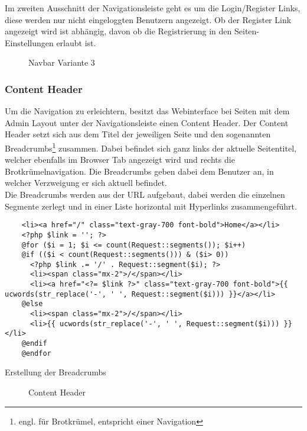 Im zweiten Ausschnitt der Navigationsleiste geht es um die Login/Register Links, diese werden nur
nicht eingeloggten Benutzern angezeigt. Ob der Register Link angezeigt wird ist
abhängig, davon ob die Registrierung in den Seiten-Einstellungen erlaubt ist.

\begin{figure}[H]
  \centering
  \caption{Navbar Variante 3}
\end{figure}

\subsubsection{Content Header}
Um die Navigation zu erleichtern, besitzt das Webinterface bei Seiten mit dem
Admin Layout unter der Navigationsleiste einen Content Header. Der
Content Header setzt sich aus dem Titel der jeweiligen Seite und den sogenannten Breadcrumbs\footnote{engl.
für Brotkrümel, entspricht einer Navigation} zusammen. Dabei befindet sich ganz
links der aktuelle Seitentitel, welcher ebenfalls im Browser Tab angezeigt wird
und rechts die Brotkrümelnavigation. Die Breadcrumbs geben dabei dem Benutzer an,
in welcher Verzweigung er sich aktuell befindet.\\

Die Breadcrumbs werden aus der URL aufgebaut, dabei werden die einzelnen
Segmente zerlegt und in einer Liste horizontal mit Hyperlinks zusammengeführt.  

\begin{listing}[H]
  \begin{verbatim}
    <li><a href="/" class="text-gray-700 font-bold">Home</a></li>
    <?php $link = ''; ?>
    @for ($i = 1; $i <= count(Request::segments()); $i++)
    @if (($i < count(Request::segments())) & ($i> 0))
      <?php $link .= '/' . Request::segment($i); ?>
      <li><span class="mx-2">/</span></li>
      <li><a href="<?= $link ?>" class="text-gray-700 font-bold">{{ ucwords(str_replace('-', ' ', Request::segment($i))) }}</a></li>
    @else 
      <li><span class="mx-2">/</span></li>
      <li>{{ ucwords(str_replace('-', ' ', Request::segment($i))) }}</li>
    @endif
    @endfor
  \end{verbatim}
  \caption{Erstellung der Breadcrumbs}
\end{listing}

\begin{figure}[H]
  \centering
  \caption{Content Header}
\end{figure}


